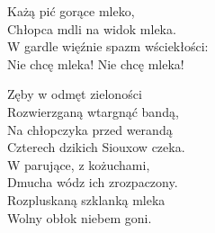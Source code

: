 \documentclass{article}
\begin{document}
	\begin{flushleft}
		Każą pić gorące mleko, \\
		Chłopca mdli na widok mleka. \\
		W gardle więźnie spazm wściekłości: \\
		Nie chcę mleka! Nie chcę mleka!\par
		
		Zęby w odmęt zieloności \\
		Rozwierzganą wtargnąć bandą, \\
		Na chłopczyka przed werandą \\
		Czterech dzikich Siouxow czeka. \\
		W parujące, z kożuchami, \\
		Dmucha wódz ich zrozpaczony. \\
		Rozpluskaną szklanką mleka \\
		Wolny obłok niebem goni.
	\end{flushleft}
\end{document}
